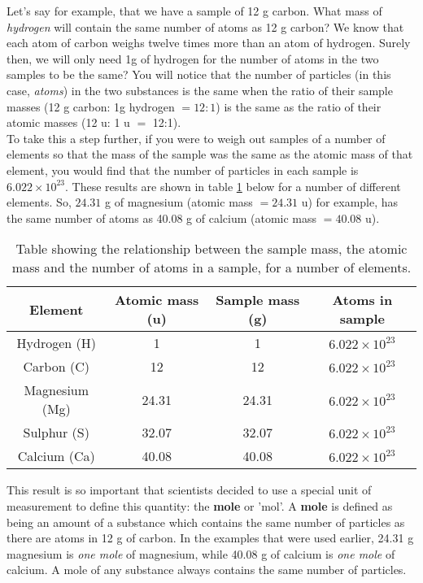 Let's say for example, that we have a sample of 12 g carbon. What mass of \textit{hydrogen} will contain the same number of atoms as 12 g carbon? We know that each atom of carbon weighs twelve times more than an atom of hydrogen. Surely then, we will only need 1g of hydrogen for the number of atoms in the two samples to be the same? You will notice that the number of particles (in this case, \textit{atoms}) in the two substances is the same when the ratio of their sample masses (12 g carbon: 1g hydrogen $= 12:1$) is the same as the ratio of their atomic masses (12 u: 1 u $=$ 12:1).\\

To take this a step further, if you were to weigh out samples of a number of elements so that the mass of the sample was the same as the atomic mass of that element, you would find that the number of particles in each sample is $6.022 \times 10^{23}$. These results are shown in table \ref{tab:quant:atoms} below for a number of different elements. So, $24.31$ g of magnesium (atomic mass $= 24.31$ u) for example, has the same number of atoms as 40.08 g of calcium (atomic mass $= 40.08$ u). 

\begin{table}[H]
\begin{center}
\begin{tabular}{|c|c|c|c|}\hline
\textbf{Element} & \textbf{Atomic mass (u)} & \textbf{Sample mass (g)} & \textbf{Atoms in sample}\\\hline
Hydrogen (H) & 1 & 1 & $6.022 \times 10^{23}$\\\hline
Carbon (C) & 12 & 12 & $6.022 \times 10^{23}$\\\hline
Magnesium (Mg) & 24.31 & 24.31 & $6.022 \times 10^{23}$\\\hline
Sulphur (S) & 32.07 & 32.07 & $6.022 \times 10^{23}$\\\hline
Calcium (Ca) & 40.08 & 40.08 & $6.022 \times 10^{23}$\\\hline
\end{tabular}
\caption{Table showing the relationship between the sample mass, the atomic mass and the number of atoms in a sample, for a number of elements.}
\label{tab:quant:atoms}
\end{center}
\end{table}

This result is so important that scientists decided to use a special unit of measurement to define this quantity: the \textbf{mole} or 'mol'. A \textbf{mole} is defined as being an amount of a substance which contains the same number of particles as there are atoms in 12 g of carbon. In the examples that were used earlier, 24.31 g magnesium is \textit{one mole} of magnesium, while 40.08 g of calcium is \textit{one mole} of calcium. A mole of any substance always contains the same number of particles.

